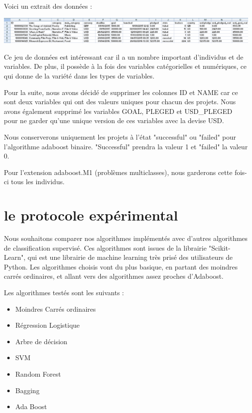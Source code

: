 \documentclass{article}
\begin{document}
\noindent Voici un extrait des données :

\begin{center} \includegraphics[scale=0.55]{extrait_donnees.PNG} \end{center}
\noindent Ce jeu de données est intéressant car il a un nombre important d'individus et de variables. De plus, il possède à la fois des variables catégorielles et numériques, ce qui donne de la variété dans les types de variables. \newline

\noindent Pour la suite, nous avons décidé de supprimer les colonnes ID et NAME car ce sont deux variables qui ont des valeurs uniques pour chacun des projets. Nous avons également supprimé les variables GOAL, PLEGED et USD\_PLEGED pour ne garder qu'une unique version de ces variables avec la devise USD.\newline

\noindent Nous conserverons uniquement les projets à l'état "successful" ou "failed" pour l'algorithme adaboost binaire. "Successful" prendra la valeur 1 et "failed" la valeur 0.\newline

\noindent Pour l'extension adaboost.M1 (problèmes multiclasses), nous garderons cette fois-ci tous les individus.


\section{le protocole expérimental}

Nous souhaitons comparer nos algorithmes implémentés avec d'autres algorithmes de classification supervisé. Ces algorithmes sont issues de la librairie "Scikit-Learn", qui est une librairie de machine learning très prisé des utilisateurs de Python. Les algorithmes choisis vont du plus basique, en partant des moindres carrés ordinaires, et allant vers des algorithmes assez proches d'Adaboost.

Les algorithmes testés sont les suivants :
\begin{itemize}
    \item Moindres Carrés ordinaires 
    \item Régression Logistique
    \item Arbre de décision
    \item SVM
    \item Random Forest
    \item Bagging
    \item Ada Boost
\end{itemize}
\end{document}
